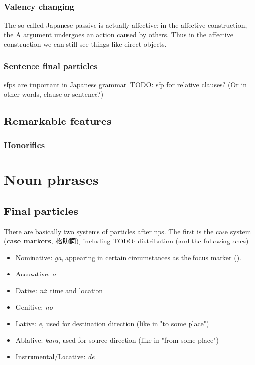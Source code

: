 \documentclass[UTF8, a4paper, oneside, scheme=plain]{ctexart}
\newcommand*{\concept}[1]{\textbf{#1}}
\newcommand{\corpus}[1]{\emph{#1}}
\begin{document}
\subsubsection{Valency changing}

The so-called Japanese passive is actually affective:
in the affective construction, the A argument undergoes an action caused by others. 
Thus in the affective construction we can still see things like direct objects.

\subsubsection{Sentence final particles}

\acs{sfp}s are important in Japanese grammar:
TODO: sfp for relative clauses? (Or in other words, clause or sentence?)

\subsection{Remarkable features}

\subsubsection{Honorifics}

\section{Noun phrases}

\subsection{Final particles}

There are basically two systems of particles after \ac{np}s.
The first is the case system (\concept{case markers}, 格助詞), including
TODO: distribution (and the following ones)
\begin{itemize}
    \item Nominative: \corpus{ga}, 
    appearing in certain circumstances as the focus marker ().
    \item Accusative: \corpus{o}
    \item Dative: \corpus{ni}: time and location 
    \item Genitive: \corpus{no} 
    \item Lative: \corpus{e}, used for destination direction (like in "to some place")
    \item Ablative: \corpus{kara}, used for source direction (like in "from some place")
    \item Instrumental/Locative: \corpus{de}
\end{itemize}
\end{document}
